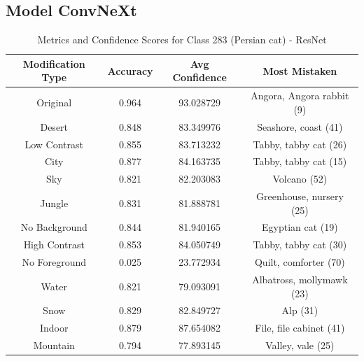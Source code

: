 \subsection*{Model ConvNeXt}


\begin{table}
	\centering
	\begin{tabular}{|c|c|c|c|}
		\hline
		\textbf{Modification Type} & \textbf{Accuracy} & \textbf{Avg Confidence} & \textbf{Most Mistaken} \\
		\hline
		Original & 0.964 & 93.028729 & Angora, Angora rabbit (9) \\
		\hline
		Desert & 0.848 & 83.349976 & Seashore, coast (41) \\
		\hline
		Low Contrast & 0.855 & 83.713232 & Tabby, tabby cat (26) \\
		\hline
		City & 0.877 & 84.163735 & Tabby, tabby cat (15) \\
		\hline
		Sky & 0.821 & 82.203083 & Volcano (52) \\
		\hline
		Jungle & 0.831 & 81.888781 & Greenhouse, nursery (25) \\
		\hline
		No Background & 0.844 & 81.940165 & Egyptian cat (19) \\
		\hline
		High Contrast & 0.853 & 84.050749 & Tabby, tabby cat (30) \\
		\hline
		No Foreground & 0.025 & 23.772934 & Quilt, comforter (70) \\
		\hline
		Water & 0.821 & 79.093091 & Albatross, mollymawk (23) \\
		\hline
		Snow & 0.829 & 82.849727 & Alp (31) \\
		\hline
		Indoor & 0.879 & 87.654082 & File, file cabinet (41) \\
		\hline
		Mountain & 0.794 & 77.893145 & Valley, vale (25) \\
		\hline
	\end{tabular}
	\caption{Metrics and Confidence Scores for Class 283 (Persian cat) - ResNet}
	\label{tab:metrics_confidence_class_283_resnet}
\end{table}

